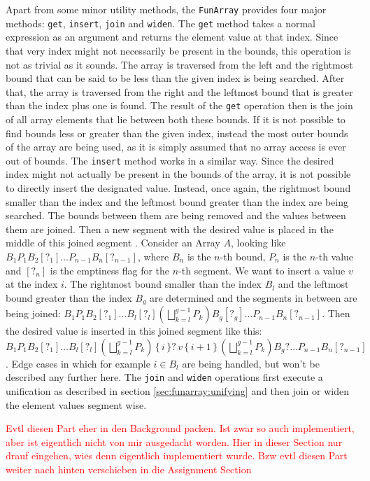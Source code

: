 \documentclass{report}
\begin{document}
Apart from some minor utility methods, the \texttt{FunArray} provides four major methods: \texttt{get}, \texttt{insert}, \texttt{join} and \texttt{widen}. The \texttt{get} method takes a normal expression as an argument and returns the element value at that index. Since that very index might not necessarily be present in the bounds, this operation is not as trivial as it sounds. The array is traversed from the left and the rightmost bound that can be said to be less than the given index is being searched. After that, the array is traversed from the right and the leftmost bound that is greater than the index plus one is found. The result of the \texttt{get} operation then is the join of all array elements that lie between both these bounds. If it is not possible to find bounds less or greater than the given index, instead the most outer bounds of the array are being used, as it is simply assumed that no array access is ever out of bounds. The \texttt{insert} method works in a similar way. Since the desired index might not actually be present in the bounds of the array, it is not possible to directly insert the designated value. Instead, once again, the rightmost bound smaller than the index and the leftmost bound greater than the index are being searched. The bounds between them are being removed and the values between them are joined. Then a new segment with the desired value is placed in the middle of this joined segment \cite{cousot2011} . Consider an Array $A$, looking like $B_1P_1B_2[?_1]\ldots P_{n-1}B_n[?_{n-1}]$, where $B_n$ is the $n$-th bound, $P_n$ is the $n$-th value and $[?_{n}]$ is the emptiness flag for the $n$-th segment. We want to insert a value $v$ at the index $i$. The rightmost bound smaller than the index $B_l$ and the leftmost bound greater than the index $B_g$ are determined and the segments in between are being joined: $B_1P_1B_2[?_1]\ldots B_l[?_l] (\bigsqcup^{g-1}_{k=l}P_k) B_g[?_g]\ldots P_{n-1}B_n[?_{n-1}]$. Then the desired value  is inserted in this joined segment like this: $B_1P_1B_2[?_1]\ldots\allowbreak B_l[?_l] (\bigsqcup^{g-1}_{k=l}P_k)\allowbreak\, \{\,i\,\}?\, v \,\{\,i+1\,\}\, \allowbreak(\bigsqcup^{g-1}_{k=l}P_k) B_g?\ldots \allowbreak P_{n-1}B_n[?_{n-1}]$. Edge cases in which for example $i\in B_l$ are being handled, but won't be described any further here. The \texttt{join} and \texttt{widen} operations first execute a unification as described in section \ref{sec:funarray:unifying} and then join or widen the element values segment wise.

\textcolor{red}{Evtl diesen Part eher in den Background packen. Ist zwar so auch implementiert, aber ist eigentlich nicht von mir ausgedacht worden. Hier in dieser Section nur drauf eingehen, wies denn eigentlich implementiert wurde. Bzw evtl diesen Part weiter nach hinten verschieben in die Assignment Section}
\end{document}
